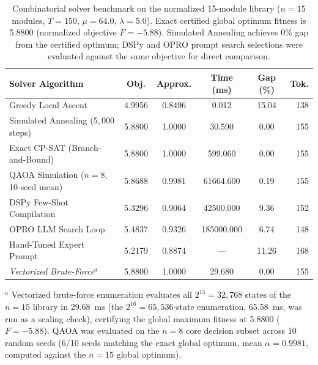 \documentclass[review,12pt,times,authoryear]{elsarticle}
\theoremstyle{definition}
\begin{document}
\begin{table}[t]
\centering
\scriptsize
\setlength{\tabcolsep}{2pt}
\renewcommand{\arraystretch}{1.12}
\caption{Combinatorial solver benchmark on the normalized 15-module library ($n=15$ modules, $T = 150$, $\mu = 64.0$, $\lambda = 5.0$). Exact certified global optimum fitness is 5.8800 (normalized objective $F = -5.88$). Simulated Annealing achieves 0\% gap from the certified optimum; DSPy and OPRO prompt search selections were evaluated against the same objective for direct comparison.}
\label{tab:solvers}
\begin{tabular*}{\columnwidth}{@{\extracolsep{\fill}}lccccr@{}}
\toprule
\textbf{Solver Algorithm} & \textbf{Obj.} & \textbf{Approx.} & \textbf{Time (ms)} & \textbf{Gap (\%)} & \textbf{Tok.} \\
\midrule
Greedy Local Ascent              & 4.9956 & 0.8496 & \phantom{000}0.012 & 15.04 & 138 \\
Simulated Annealing ($5{,}000$ steps) & 5.8800 & 1.0000 & \phantom{00}30.590 & 0.00 & 155 \\
Exact CP-SAT (Branch-and-Bound)  & 5.8800 & 1.0000 & \phantom{0}599.060 & 0.00 & 155 \\
QAOA Simulation ($n=8$, 10-seed mean) & 5.8688 & 0.9981 & 61664.600 & 0.19 & 155 \\
DSPy Few-Shot Compilation        & 5.3296 & 0.9064 & 42500.000 & 9.36 & 152 \\
OPRO LLM Search Loop             & 5.4837 & 0.9326 & 185000.000 & 6.74 & 148 \\
Hand-Tuned Expert Prompt         & 5.2179 & 0.8874 & --- & 11.26 & 168 \\
\emph{Vectorized Brute-Force}$^a$ & 5.8800 & 1.0000 & \phantom{00}29.680 & 0.00 & 155 \\
\bottomrule
\end{tabular*}
\vspace{1pt}\par\footnotesize{$^a$ Vectorized brute-force enumeration evaluates all $2^{15}=32{,}768$ states of the $n=15$ library in \SI{29.68}{\milli\second} (the $2^{16}=65{,}536$-state enumeration, \SI{65.58}{\milli\second}, was run as a scaling check), certifying the global maximum fitness at 5.8800 ($F = -5.88$). QAOA was evaluated on the $n=8$ core decision subset across 10 random seeds (6/10 seeds matching the exact global optimum, mean $\alpha = 0.9981$, computed against the $n=15$ global optimum).}
\end{table}
\end{document}
